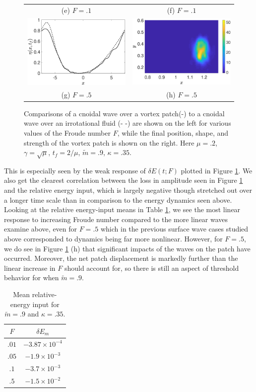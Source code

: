 \documentclass[a4paper,11pt]{article}
\begin{document}
\begin{figure}
\begin{tabular}{cc}
(e)  $F=.1$ & (f)  $F=.1$\\
\includegraphics[width=.35\textwidth]{profiles_wm_50_modu_pt9} & \includegraphics[width=.35\textwidth]{vorticity_wm_50_modu_pt9}\\
(g)  $F=.5$ & (h)  $F=.5$
\end{tabular}
\caption{Comparisons of a cnoidal wave over a vortex patch(-) to a cnoidal wave over an irrotational fluid (- -) are shown on the left for various values of the Froude number $F$, while the final position, shape, and strength of the vortex patch is shown on the right.  Here $\mu=.2$, $\gamma=\sqrt{\mu}$, $t_{f}=2/\mu$, $\tilde{m}=.9$, $\kappa = .35$.}
\label{fig:highsolwave}
\end{figure}

This is especially seen by the weak response of $\delta E(t;F)$ plotted in Figure \ref{fig:highsolwave}.  We also get the clearest correlation between the loss in amplitude seen in Figure \ref{fig:highsolwave} and the relative energy input, which is largely negative though stretched out over a longer time scale than in comparison to the energy dynamics seen above.  Looking at the relative energy-input means in Table \ref{tab:highsolmean}, we see the most linear response to increasing Froude number compared to the more linear waves examine above, even for $F=.5$ which in the previous surface wave cases studied above corresponded to dynamics being far more nonlinear.  However, for $F=.5$, we do see in Figure \ref{fig:highsolwave} (h) that significant impacts of the waves on the patch have occurred.  Moreover, the net patch displacement is markedly further than the linear increase in $F$ should account for, so there is still an aspect of threshold behavior for when $\tilde{m}=.9$.
\begin{table}
\centering
\begin{tabular}{c|c}
$F$ & $\delta E_{m}$ \\
\hline
$.01$ & $-3.87 \times 10^{-4}$\\
$.05$ & $-1.9 \times 10^{-3}$\\
$.1$ & $-3.7 \times 10^{-3}$\\
$.5$ & $-1.5 \times 10^{-2}$
\end{tabular}
\caption{Mean relative-energy input for $\tilde{m}=.9$ and $\kappa=.35$.}
\label{tab:highsolmean}
\end{table}
\end{document}
